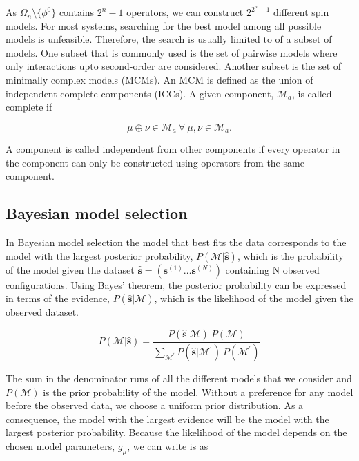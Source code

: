 \noindent
As $\Omega_n \setminus \{ \phi^0 \}$ contains $2^n-1$ operators, we can construct $2^{2^n-1}$ different spin models.
For most systems, searching for the best model among all possible models is unfeasible.
Therefore, the search is usually limited to of a subset of models.
One subset that is commonly used is the set of pairwise models where only interactions upto second-order are considered.
Another subset is the set of minimally complex models (MCMs).
An MCM is defined as the union of independent complete components (ICCs).
A given component, $\mathcal{M}_a$, is called complete if

\begin{equation}
    \mu \oplus \nu \in \mathcal{M}_a \: \forall \: \mu, \nu \in \mathcal{M}_a.
\end{equation}

\noindent
A component is called independent from other components if every operator in the component can only be constructed using operators from the same component.

\subsection{Bayesian model selection}

In Bayesian model selection the model that best fits the data corresponds to the model with the largest posterior probability, $P(\mathcal{M} | \mathbf{\hat{s}})$, which is the probability of the model given the dataset $\mathbf{\hat{s}} = (\mathbf{s}^{(1)} \dots \mathbf{s}^{(N)})$ containing N observed configurations.
Using Bayes' theorem, the posterior probability can be expressed in terms of the evidence, $P(\mathbf{\hat{s}}|\mathcal{M})$, which is the likelihood of the model given the observed dataset.

\begin{equation}
    P(\mathcal{M} | \mathbf{\hat{s}}) = \frac{P(\mathbf{\hat{s}}|\mathcal{M}) \: P(\mathcal{M}) }{\sum_{\mathcal{M}^\prime}P(\mathbf{\hat{s}}|\mathcal{M}^\prime) \: P(\mathcal{M}^\prime)}
\end{equation}

\noindent
The sum in the denominator runs of all the different models that we consider and $P(\mathcal{M})$ is the prior probability of the model.
Without a preference for any model before the observed data, we choose a uniform prior distribution.
As a consequence, the model with the largest evidence will be the model with the largest posterior probability.
Because the likelihood of the model depends on the chosen model parameters, $g_\mu$, we can write is as

